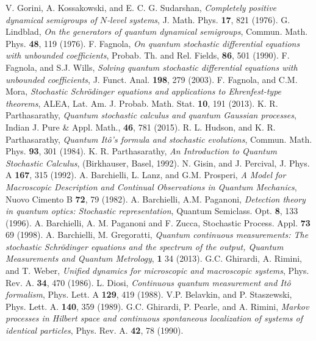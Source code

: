 \begin{thebibliography}{99}
	 V. Gorini, A. Kossakowski, and E. C. G. Sudarshan, {\em Completely positive dynamical semigroups of $N$‐level systems},  J. Math. Phys. {\bf 17}, 821 (1976).
	 G. Lindblad, {\em On the generators of quantum dynamical semigroups}, Commun. Math. Phys. {\bf 48}, 119  (1976).
	 F. Fagnola, {\em On quantum stochastic differential equations with unbounded coefficients}, Probab.
	Th. and Rel. Fields, {\bf 86}, 501 (1990).
	 F. Fagnola, and S.J. Wills, {\em Solving quantum stochastic differential equations with unbounded coefficients},  J. Funct. Anal.
	{\bf 198}, 279 (2003).
	 F. Fagnola, and C.M. Mora, {\em Stochastic Schrödinger equations and applications to Ehrenfest-type theorems}, ALEA, Lat. Am. J. Probab. Math. Stat. {\bf 10}, 191 (2013).
	 K. R. Parthasarathy, {\em Quantum stochastic calculus and quantum Gaussian processes}, Indian J. Pure \& Appl. Math., {\bf 46}, 781 (2015).
	 R. L. Hudson, and K. R. Parthasarathy, {\em Quantum  It\^{o}'s  formula  and  stochastic  evolutions},  Commun. Math. Phys. {\bf 93}, 301 (1984).
	  K. R. Parthasarathy, {\em An Introduction to Quantum Stochastic Calculus}, (Birkhauser, Basel, 1992). 
	 N. Gisin, and J. Percival,  J. Phys. A {\bf 167}, 315 (1992).
	 A. Barchielli, L. Lanz, and  G.M. Prosperi, {\em A Model for Macroscopic Description and Continual Observations in Quantum Mechanics},  Nuovo Cimento B {\bf 72}, 79 (1982). 
	 A. Barchielli, A.M. Paganoni, {\em Detection theory in quantum optics: Stochastic representation}, Quantum Semiclass. Opt. {\bf 8}, 133 (1996). 
	 A. Barchielli, A. M. Paganoni and F. Zucca, 	Stochastic Process. Appl. {\bf 73} 69 (1998). 
	 A. Barchielli, M. Gregoratti, {\em Quantum continuous measurements: The stochastic Schr{\"o}dinger equations and the spectrum of the output, Quantum Measurements and Quantum Metrology}, {\bf 1} 34 (2013).  
	 G.C. Ghirardi, A. Rimini, and  T. Weber, {\em Unified dynamics for microscopic and macroscopic systems}, Phys. Rev. A. {\bf 34}, 470 (1986). 
	 L. Diosi, {\em Continuous quantum measurement and It\^o formalism}, Phys. Lett. A {\bf 129}, 419 (1988). 
	 V.P. Belavkin, and  P. Staszewski, Phys. Lett. A. {\bf 140}, 359 (1989).
	 G.C. Ghirardi, P. Pearle, and  A. Rimini, {\em Markov processes in Hilbert space and continuous spontaneous localization of systems of identical particles}, Phys. Rev. A. {\bf 42}, 78 (1990). 

\end{thebibliography}
